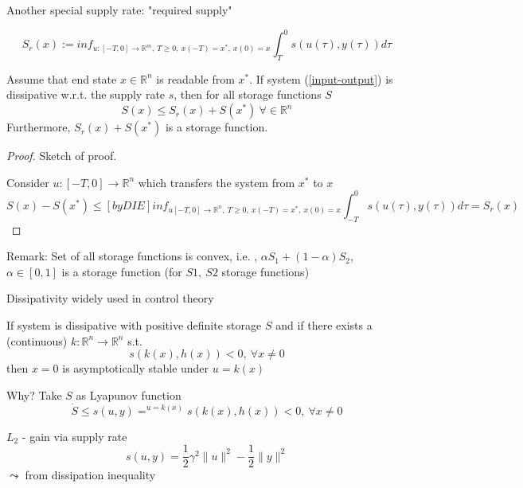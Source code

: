 Another special supply rate: "required supply"

\begin{equation*}
S_r(x) := inf_{u:[-T,0] \to \mathbb{R}^m, \ T \geq 0, \ x(-T) = x^*, \ x(0) = x} \int_T^0 s(u(\tau), y(\tau))d\tau
\end{equation*}

\begin{Theorem}
Assume that end state $x \in \mathbb{R}^n$ is readable from $x^*$. If system (\ref{input-output}) is dissipative w.r.t. the supply rate $s$, then for all storage functions $S$
\begin{equation*}
S(x) \leq S_r(x) + S(x^*) \ \forall \in \mathbb{R}^n
\end{equation*}
Furthermore, $S_r(x) + S(x^*)$ is a storage function.
\begin{proof}
Sketch of proof.

Consider $u:[-T,0] \to \mathbb{R}^n$ which transfers the system from $x^*$ to $x$
\begin{equation*}
S(x) - S(x^*) \leq[by DIE] inf_{u[-T,0] \to \mathbb{R}^n, \ T \geq 0, \ x(-T) = x^*, \ x(0) = x} \int_{-T}^0 s(u(\tau), y(\tau))d\tau = S_r(x)
\end{equation*}
\end{proof}
\end{Theorem}

Remark: Set of all storage functions is convex, i.e. , $\alpha S_1 + (1-\alpha) S_2$, $\alpha\in [0,1]$ is a storage function (for $S1, \ S2$ storage functions)

Dissipativity widely used in control theory

If system is dissipative with positive definite storage $S$ and if there exists a (continuous) $k: \mathbb{R}^n \to \mathbb{R}^n$ s.t. 
\begin{equation*}
s(k(x),h(x)) < 0, \ \forall x \neq 0
\end{equation*}
then $x=0$ is asymptotically stable under $u=k(x)$

Why? Take $S$ as Lyapunov function 
\begin{equation*}
\dot{S} \leq s(u,y) =^{u=k(x)} s(k(x),h(x)) < 0, \ \forall x \neq 0
\end{equation*}

$L_2$ - gain via supply rate 
\begin{equation*}
s(u,y) = \frac{1}{2} \gamma^2 \|u\|^2 - \frac{1}{2}\|y\|^2
\end{equation*}
$\leadsto $ from dissipation inequality

